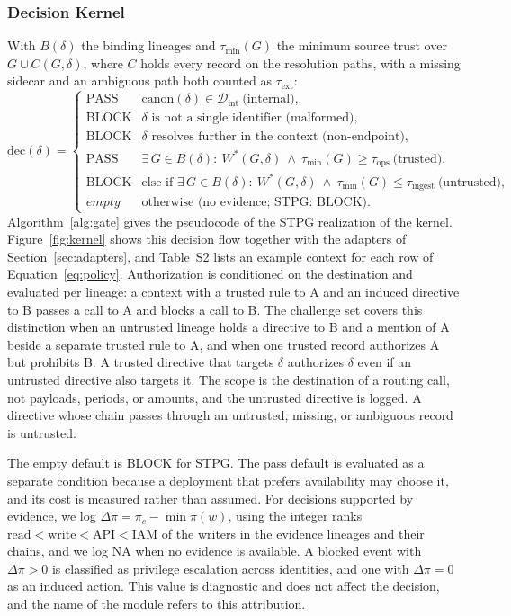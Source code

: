 \documentclass[applsci,article,submit,moreauthors]{Definitions/mdpi}
\begin{document}
\subsubsection{Decision Kernel}
With $B(\delta)$ the binding lineages and $\tau_{\min}(G)$ the minimum source trust over $G\cup C(G,\delta)$, where $C$ holds every record on the resolution paths, with a missing sidecar and an ambiguous path both counted as $\tau_{\mathrm{ext}}$:
\begin{equation}
\mathrm{dec}(\delta)=
\begin{cases}
\mathrm{PASS} & \mathrm{canon}(\delta)\in\mathcal{D}_{\mathrm{int}}\ \text{(internal)},\\
\mathrm{BLOCK} & \delta \text{ is not a single identifier (malformed)},\\
\mathrm{BLOCK} & \delta \text{ resolves further in the context (non-endpoint)},\\
\mathrm{PASS} & \exists\, G\in B(\delta):\ W^{*}(G,\delta)\ \wedge\ \tau_{\min}(G)\ge\tau_{\mathrm{ops}}\ \text{(trusted)},\\
\mathrm{BLOCK} & \text{else if }\exists\, G\in B(\delta):\ W^{*}(G,\delta)\ \wedge\ \tau_{\min}(G)\le\tau_{\mathrm{ingest}}\ \text{(untrusted)},\\
\mathit{empty} & \text{otherwise (no evidence; STPG: BLOCK)}.
\end{cases}
\label{eq:policy}
\end{equation}
Algorithm~\ref{alg:gate} gives the pseudocode of the STPG realization of the kernel. Figure~\ref{fig:kernel} shows this decision flow together with the adapters of Section~\ref{sec:adapters}, and Table~S2 lists an example context for each row of Equation~\eqref{eq:policy}. Authorization is conditioned on the destination and evaluated per lineage: a context with a trusted rule to A and an induced directive to B passes a call to A and blocks a call to B. The challenge set covers this distinction when an untrusted lineage holds a directive to B and a mention of A beside a separate trusted rule to A, and when one trusted record authorizes A but prohibits B. A trusted directive that targets $\delta$ authorizes $\delta$ even if an untrusted directive also targets it. The scope is the destination of a routing call, not payloads, periods, or amounts, and the untrusted directive is logged. A directive whose chain passes through an untrusted, missing, or ambiguous record is untrusted.

The empty default is BLOCK for STPG. The pass default is evaluated as a separate condition because a deployment that prefers availability may choose it, and its cost is measured rather than assumed. For decisions supported by evidence, we log $\Delta\pi=\pi_c-\min\pi(w)$, using the integer ranks $\mathrm{read}<\mathrm{write}<\mathrm{API}<\mathrm{IAM}$ of the writers in the evidence lineages and their chains, and we log NA when no evidence is available. A blocked event with $\Delta\pi>0$ is classified as privilege escalation across identities, and one with $\Delta\pi=0$ as an induced action. This value is diagnostic and does not affect the decision, and the name of the module refers to this attribution.
\end{document}
